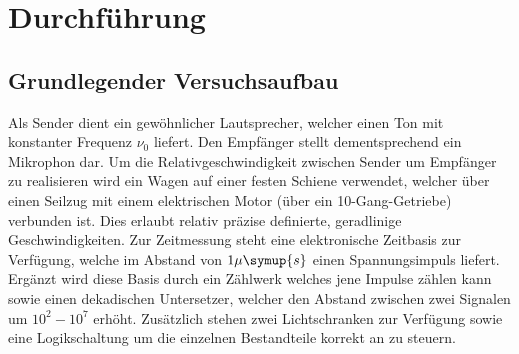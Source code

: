 \newpage
\section{Durchführung}
\label{sec:Durchführung}
\subsection{Grundlegender Versuchsaufbau}
\label{sec:Aufbau}
Als Sender dient ein gewöhnlicher Lautsprecher, welcher einen Ton mit
konstanter Frequenz
$\nu_0$ liefert. Den Empfänger stellt dementsprechend ein Mikrophon dar.
Um die Relativgeschwindigkeit zwischen Sender um Empfänger zu realisieren wird
ein Wagen auf einer festen Schiene verwendet, welcher über einen Seilzug mit
einem elektrischen Motor (über ein 10-Gang-Getriebe) verbunden ist. Dies
erlaubt relativ präzise definierte, geradlinige Geschwindigkeiten.
Zur Zeitmessung steht eine elektronische Zeitbasis zur Verfügung, welche im
Abstand von $1 \mu \symup{s}$ einen Spannungsimpuls liefert. Ergänzt wird
diese Basis durch ein Zählwerk welches jene Impulse zählen kann sowie einen
dekadischen Untersetzer, welcher den Abstand zwischen zwei Signalen um
$10^2 - 10^7$ erhöht. Zusätzlich stehen zwei Lichtschranken zur Verfügung
sowie eine Logikschaltung um die einzelnen Bestandteile korrekt an zu steuern.

